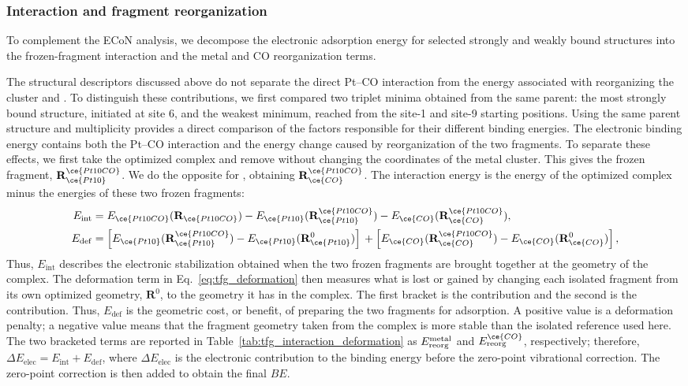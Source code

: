 \subsubsection{Interaction and fragment reorganization}
{To complement the ECoN analysis, we decompose the electronic adsorption
energy for selected strongly and weakly bound structures into the frozen-fragment
interaction and the metal and CO reorganization terms.}

The structural descriptors discussed above do not separate the direct
Pt--CO interaction from the energy associated with reorganizing the cluster
and . To distinguish these contributions, we first compared two
triplet  minima obtained from the same  parent:
the most strongly bound structure, initiated at site 6, and the weakest
minimum, reached from the site-1 and site-9 starting positions. Using the same
parent structure and multiplicity provides a direct comparison of the factors
responsible for their different binding energies. The electronic binding
energy contains both the Pt--CO interaction and the energy change caused by
reorganization of the two fragments. To separate these effects,
we first take the optimized  complex and remove  without
changing the coordinates of the metal cluster. This gives the frozen
 fragment, \(\mathbf R_{\ce{Pt10}}^{\ce{Pt10CO}}\). We do the
opposite for , obtaining
\(\mathbf R_{\ce{CO}}^{\ce{Pt10CO}}\). The interaction energy is the energy
of the optimized complex minus the energies of these two frozen fragments:
\begin{align}
E_{\mathrm{int}} &=
E_{\ce{Pt10CO}}(\mathbf R_{\ce{Pt10CO}})
-E_{\ce{Pt10}}(\mathbf R_{\ce{Pt10}}^{\ce{Pt10CO}})
-E_{\ce{CO}}(\mathbf R_{\ce{CO}}^{\ce{Pt10CO}}),\\
E_{\mathrm{def}} &=
\left[
E_{\ce{Pt10}}(\mathbf R_{\ce{Pt10}}^{\ce{Pt10CO}})
-E_{\ce{Pt10}}(\mathbf R_{\ce{Pt10}}^{0})
\right]
{}+
\left[
E_{\ce{CO}}(\mathbf R_{\ce{CO}}^{\ce{Pt10CO}})
-E_{\ce{CO}}(\mathbf R_{\ce{CO}}^{0})
\right],
\label{eq:tfg_deformation}
\end{align}
Thus, $E_{\mathrm{int}}$ describes the electronic stabilization obtained when
the two frozen fragments are brought together at the geometry of the complex.
The deformation term in Eq.~\ref{eq:tfg_deformation} then measures what is
lost or gained by changing each isolated fragment from its own optimized
geometry, \(\mathbf R^0\), to the geometry it has in the complex. The first
bracket is the  contribution and the second is the 
contribution. Thus, $E_{\mathrm{def}}$ is the geometric cost, or benefit, of
preparing the two fragments for adsorption. A positive value is a deformation penalty; a negative value
means that the fragment geometry taken from the complex is more stable than
the isolated reference used here. The two bracketed terms are reported in
Table~\ref{tab:tfg_interaction_deformation} as
$E_{\rm reorg}^{\rm metal}$ and $E_{\rm reorg}^{\ce{CO}}$, respectively;
therefore,
$\Delta E_{\mathrm{elec}}=E_{\mathrm{int}}+E_{\mathrm{def}}$, where
$\Delta E_{\mathrm{elec}}$ is the electronic contribution to the binding
energy before the zero-point vibrational correction. The zero-point correction
is then added to obtain the final $BE$.


